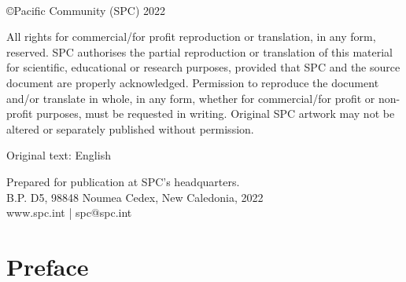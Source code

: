 \documentclass[a4paper,12pt,twoside]{book}
\begin{document}

%

\mbox{ }
\vspace{4cm}

\begin{center}{\copyright Pacific Community (SPC) 2022}\end{center}
All rights for commercial/for profit reproduction or translation, in any form, reserved. SPC authorises the partial reproduction or translation of this material for scientific, educational or research purposes, provided that SPC and the source document are properly acknowledged. Permission to reproduce the document and/or translate in whole, in any form, whether for commercial/for profit or non-profit purposes, must be requested in writing. Original SPC artwork may not be altered or separately published without permission.

\vspace{.5cm}

\begin{center} 
Original text: English

\vspace{2cm}

\vspace{7.5cm}
Prepared for publication at SPC’s headquarters. \\
B.P. D5, 98848 Noumea Cedex, New Caledonia, 2022 \\

www.spc.int | spc@spc.int

\end{center}

\chapter*{Preface}
\end{document}
